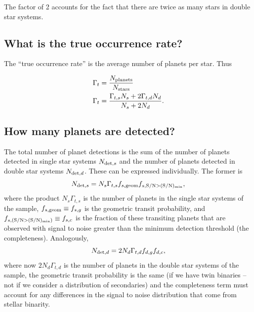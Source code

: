 \documentclass{emulateapj}
\begin{document}
The factor of 2 accounts for the fact that there are twice as many stars in 
double star systems.



\subsection{What is the true occurrence rate?}
\label{sec:true_rate}

The ``true occurrence rate'' is the average number of planets per star. Thus

\begin{align}
\Gamma_t &= \frac{N_{\rm planets}}{N_{\rm stars}} \\
\Gamma_t &= \frac{\Gamma_{t,s} N_s + 2 \Gamma_{t,d} N_d}{N_s + 2N_d}.
\label{eq:true_occ}
\end{align}



\subsection{How many planets are detected?}
The total number of planet detections is the sum of the number of planets 
detected in single star systems $N_{{\rm det},s}$ and the number of planets 
detected in double star systems $N_{{\rm det},d}$.
These can be expressed individually. 
The former is
\begin{equation}
N_{{\rm det},s} = N_s \Gamma_{t,s} f_{s,{\rm geom}} f_{s,{\rm S/N} > {\rm 
(S/N)_{min}}},
\label{eq:N_det_s}
\end{equation}
where the product $N_s \Gamma_{t,s}$ is the number of planets in the single 
star systems of the sample, $f_{s,{\rm geom}}\equiv f_{s,g}$ is the geometric 
transit probability, and $f_{s,({\rm S/N} > {\rm (S/N)_{min}})} \equiv f_{s,c}$ 
is the fraction of these transiting planets that are observed with signal to 
noise greater than the minimum detection threshold (the completeness). 
Analogously,
\begin{equation}
N_{{\rm det},d} = 2 N_d \Gamma_{t,d} f_{d,g} f_{d,c},
\label{eq:N_det_d}
\end{equation}
where now $2 N_d \Gamma_{t,d}$ is the number of planets in the double star 
systems of the sample, the geometric transit probability is the same (if we 
have twin binaries -- not if we consider a distribution of secondaries) and the 
completeness term must account for any differences in the signal to noise 
distribution that come from stellar binarity.
\end{document}
